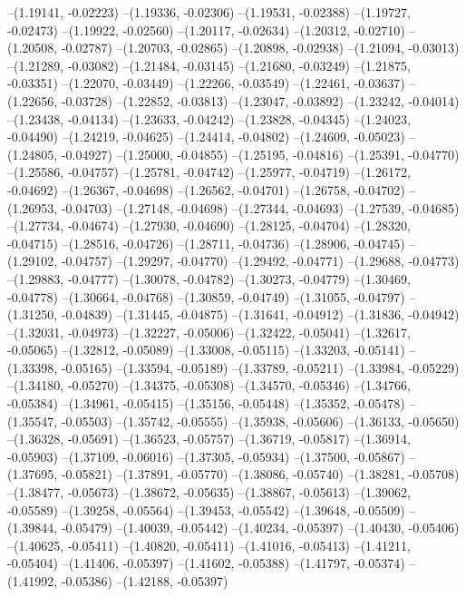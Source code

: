 --(1.19141, -0.02223)
--(1.19336, -0.02306)
--(1.19531, -0.02388)
--(1.19727, -0.02473)
--(1.19922, -0.02560)
--(1.20117, -0.02634)
--(1.20312, -0.02710)
--(1.20508, -0.02787)
--(1.20703, -0.02865)
--(1.20898, -0.02938)
--(1.21094, -0.03013)
--(1.21289, -0.03082)
--(1.21484, -0.03145)
--(1.21680, -0.03249)
--(1.21875, -0.03351)
--(1.22070, -0.03449)
--(1.22266, -0.03549)
--(1.22461, -0.03637)
--(1.22656, -0.03728)
--(1.22852, -0.03813)
--(1.23047, -0.03892)
--(1.23242, -0.04014)
--(1.23438, -0.04134)
--(1.23633, -0.04242)
--(1.23828, -0.04345)
--(1.24023, -0.04490)
--(1.24219, -0.04625)
--(1.24414, -0.04802)
--(1.24609, -0.05023)
--(1.24805, -0.04927)
--(1.25000, -0.04855)
--(1.25195, -0.04816)
--(1.25391, -0.04770)
--(1.25586, -0.04757)
--(1.25781, -0.04742)
--(1.25977, -0.04719)
--(1.26172, -0.04692)
--(1.26367, -0.04698)
--(1.26562, -0.04701)
--(1.26758, -0.04702)
--(1.26953, -0.04703)
--(1.27148, -0.04698)
--(1.27344, -0.04693)
--(1.27539, -0.04685)
--(1.27734, -0.04674)
--(1.27930, -0.04690)
--(1.28125, -0.04704)
--(1.28320, -0.04715)
--(1.28516, -0.04726)
--(1.28711, -0.04736)
--(1.28906, -0.04745)
--(1.29102, -0.04757)
--(1.29297, -0.04770)
--(1.29492, -0.04771)
--(1.29688, -0.04773)
--(1.29883, -0.04777)
--(1.30078, -0.04782)
--(1.30273, -0.04779)
--(1.30469, -0.04778)
--(1.30664, -0.04768)
--(1.30859, -0.04749)
--(1.31055, -0.04797)
--(1.31250, -0.04839)
--(1.31445, -0.04875)
--(1.31641, -0.04912)
--(1.31836, -0.04942)
--(1.32031, -0.04973)
--(1.32227, -0.05006)
--(1.32422, -0.05041)
--(1.32617, -0.05065)
--(1.32812, -0.05089)
--(1.33008, -0.05115)
--(1.33203, -0.05141)
--(1.33398, -0.05165)
--(1.33594, -0.05189)
--(1.33789, -0.05211)
--(1.33984, -0.05229)
--(1.34180, -0.05270)
--(1.34375, -0.05308)
--(1.34570, -0.05346)
--(1.34766, -0.05384)
--(1.34961, -0.05415)
--(1.35156, -0.05448)
--(1.35352, -0.05478)
--(1.35547, -0.05503)
--(1.35742, -0.05555)
--(1.35938, -0.05606)
--(1.36133, -0.05650)
--(1.36328, -0.05691)
--(1.36523, -0.05757)
--(1.36719, -0.05817)
--(1.36914, -0.05903)
--(1.37109, -0.06016)
--(1.37305, -0.05934)
--(1.37500, -0.05867)
--(1.37695, -0.05821)
--(1.37891, -0.05770)
--(1.38086, -0.05740)
--(1.38281, -0.05708)
--(1.38477, -0.05673)
--(1.38672, -0.05635)
--(1.38867, -0.05613)
--(1.39062, -0.05589)
--(1.39258, -0.05564)
--(1.39453, -0.05542)
--(1.39648, -0.05509)
--(1.39844, -0.05479)
--(1.40039, -0.05442)
--(1.40234, -0.05397)
--(1.40430, -0.05406)
--(1.40625, -0.05411)
--(1.40820, -0.05411)
--(1.41016, -0.05413)
--(1.41211, -0.05404)
--(1.41406, -0.05397)
--(1.41602, -0.05388)
--(1.41797, -0.05374)
--(1.41992, -0.05386)
--(1.42188, -0.05397)
